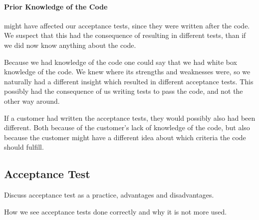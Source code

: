 \paragraph{Prior Knowledge of the Code} might have affected our acceptance tests, since they were written after the code. We suspect that this had the consequence of resulting in different tests, than if we did now know anything about the code. 

Because we had knowledge of the code one could say that we had white box knowledge of the code. We knew where its strengths and weaknesses were, so we naturally had a different insight which resulted in different acceptance tests.
This possibly had the consequence of us writing tests to pass the code, and not the other way around. 

If a customer had written the acceptance tests, they would possibly also had been different. Both because of the customer's lack of knowledge of the code, but also because the customer might have a different idea about which criteria the code should fulfill.


\subsection{Acceptance Test}
Discuss acceptance test as a practice, advantages and disadvantages.

How we see acceptance tests done correctly and why it is not more used.
